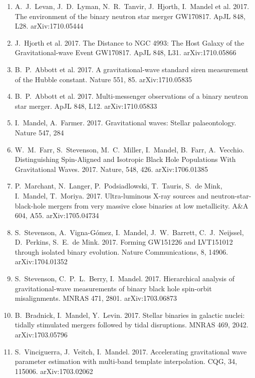 \documentclass[margin,line]{res}
\begin{document}
\begin{resume}
\begin{enumerate}
\item A.~J.~Levan, J.~D.~Lyman, N.~R.~Tanvir, J.~Hjorth, I.~Mandel et al. 2017. The environment of the binary neutron star merger GW170817.  ApJL 848, L28.  arXiv:1710.05444

\item J.~Hjorth et al. 2017. The Distance to NGC 4993: The Host Galaxy of the Gravitational-wave Event GW170817.  ApJL 848, L31.  arXiv:1710.05866

\item B.~P.~Abbott et al. 2017.   A gravitational-wave standard siren measurement of the Hubble constant.  Nature 551, 85. arXiv:1710.05835

\item B.~P.~Abbott et al. 2017. Multi-messenger observations of a binary neutron star merger. ApJL 848, L12. arXiv:1710.05833

\item I.~Mandel, A.~Farmer.  2017. Gravitational waves: Stellar palaeontology.  Nature 547, 284

\item W.~M.~Farr, S.~Stevenson, M.~C.~Miller, I.~Mandel, B.~Farr, A.~Vecchio.  Distinguishing Spin-Aligned and Isotropic Black Hole Populations With Gravitational Waves. 2017. Nature, 548, 426. arXiv:1706.01385

\item P.~Marchant, N.~Langer, P.~Podsiadlowski, T.~Tauris, S.~de Mink, I.~Mandel, T.~Moriya.  2017.  Ultra-luminous X-ray sources and neutron-star-black-hole mergers from very massive close binaries at low metallicity.  A\&A 604, A55.  arXiv:1705.04734

\item S.~Stevenson, A.~Vigna-G\'omez, I.~Mandel, J.~W.~Barrett, C.~J.~Neijssel, D.~Perkins, S.~E.~de Mink.  2017.  Forming GW151226 and LVT151012 through isolated binary evolution.  Nature Communications, 8,  14906.  arXiv:1704.01352

\item S.~Stevenson, C.~P.~L.~Berry, I.~Mandel.  2017.  Hierarchical analysis of gravitational-wave measurements of binary black hole spin-orbit misalignments.  MNRAS 471, 2801. arXiv:1703.06873

\item B.~Bradnick, I.~Mandel, Y.~Levin. 2017.  Stellar binaries in galactic nuclei: tidally stimulated mergers followed by tidal disruptions.  MNRAS 469, 2042.  arXiv:1703.05796

\item S.~Vinciguerra, J.~Veitch, I.~Mandel.  2017.  Accelerating gravitational wave parameter estimation with multi-band template interpolation.  CQG, 34, 115006.  arXiv:1703.02062


\end{enumerate}
\end{resume}
\end{document}

